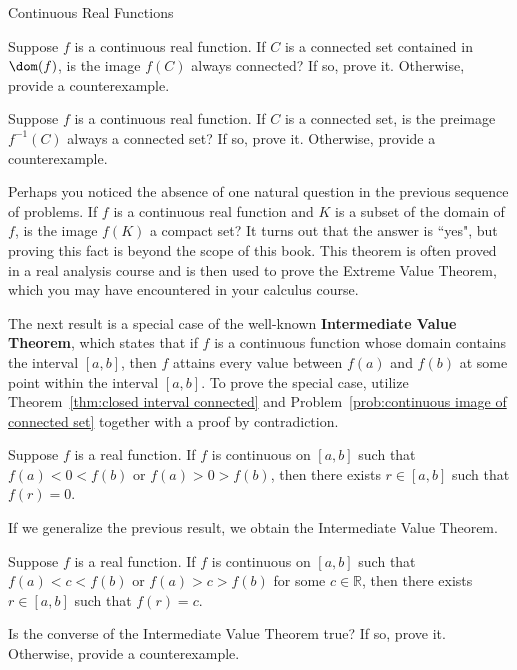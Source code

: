 \begin{section}{Continuous Real Functions}


\begin{problem}\label{prob:continuous image of connected set}
Suppose $f$ is a continuous real function. If $C$ is a connected set contained in $\dom(f)$, is the image $f(C)$ always connected?  If so, prove it.  Otherwise, provide a counterexample.
\end{problem}

\begin{problem}
Suppose $f$ is a continuous real function. If $C$ is a connected set, is the preimage $f^{-1}(C)$ always a connected set? If so, prove it.  Otherwise, provide a counterexample.
\end{problem}

Perhaps you noticed the absence of one natural question in the previous sequence of problems. If $f$ is a continuous real function and $K$ is a subset of the domain of $f$, is the image $f(K)$ a compact set?  It turns out that the answer is ``yes", but proving this fact is beyond the scope of this book. This theorem is often proved in a real analysis course and is then used to prove the Extreme Value Theorem, which you may have encountered in your calculus course.

The next result is a special case of the well-known \textbf{Intermediate Value Theorem}, which states that if $f$ is a continuous function whose domain contains the interval $[a,b]$, then $f$ attains every value between $f(a)$ and $f(b)$ at some point within the interval $[a,b]$. To prove the special case, utilize Theorem~\ref{thm:closed interval connected} and Problem~\ref{prob:continuous image of connected set} together with a proof by contradiction.

\begin{theorem}
Suppose $f$ is a real function. If $f$ is continuous on $[a,b]$ such that $f(a)<0<f(b)$ or $f(a)>0>f(b)$, then there exists $r\in [a,b]$ such that $f(r)=0$.
\end{theorem}

If we generalize the previous result, we obtain the Intermediate Value Theorem.

\begin{theorem}
Suppose $f$ is a real function. If $f$ is continuous on $[a,b]$ such that $f(a)<c<f(b)$ or $f(a)>c>f(b)$ for some $c\in \mathbb{R}$, then there exists $r\in [a,b]$ such that $f(r)=c$.
\end{theorem}

\begin{problem}
Is the converse of the Intermediate Value Theorem true? If so, prove it.  Otherwise, provide a counterexample.
\end{problem}

\end{section}